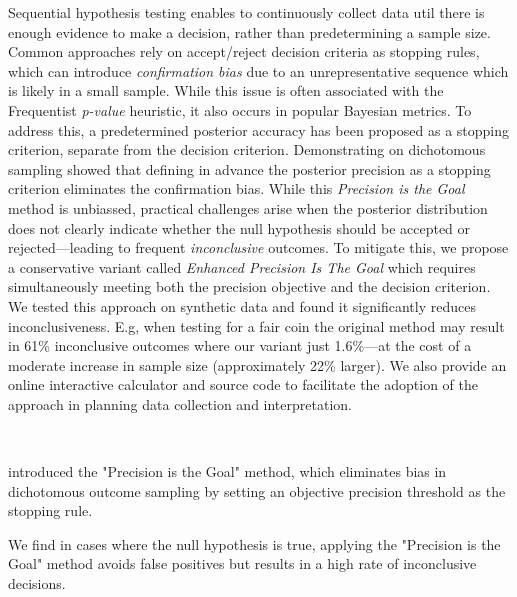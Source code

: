 Sequential hypothesis testing enables to continuously collect data util there is enough
evidence to make a decision, rather than predetermining a sample
size.
Common approaches rely on accept/reject decision criteria as stopping rules,
which can introduce {\it confirmation bias} due to an unrepresentative sequence which is
likely in a small sample.
While this issue is often associated with the Frequentist {\it p-value} heuristic,
it also occurs in popular Bayesian metrics.
To address this, a predetermined posterior accuracy has been proposed
as a stopping criterion, separate from the decision criterion.
Demonstrating on dichotomous sampling \cite{kruschke2015doing} showed that
defining in advance the
posterior precision as a stopping criterion eliminates the confirmation bias.
While this {\it Precision is the Goal} method is unbiassed,
practical challenges arise when the posterior distribution does not clearly indicate
whether the null hypothesis should be accepted or rejected—leading to frequent {\it inconclusive}
outcomes.
To mitigate this, we propose a conservative variant called
{\it Enhanced Precision Is The Goal} which requires simultaneously meeting both the
precision objective and the decision criterion.
We tested this approach on synthetic data and found it significantly reduces
inconclusiveness. E.g, when testing for a fair coin the original method may result in 61\%
inconclusive outcomes where our variant just 1.6\%—at the cost of a moderate increase in sample
size (approximately 22\% larger).
We also provide an online interactive calculator and source code to facilitate the adoption of the
approach in planning data collection and interpretation.


\
\

\cite{kruschke2015doing} introduced the "Precision is the Goal" method,
which eliminates bias in dichotomous outcome sampling by setting an objective precision threshold as the stopping rule.

We find in cases where the null hypothesis is true,
applying the "Precision is the Goal" method avoids false positives but results in a high rate of inconclusive decisions.


\
\



